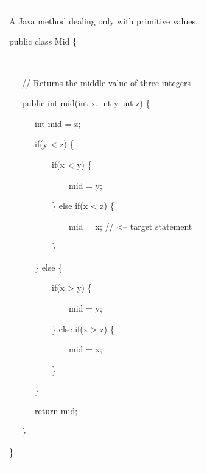 \documentclass{article}
\newenvironment{tmindent}{\begin{tmparmod}{1.5em}{0pt}{0pt} }{\end{tmparmod}}
\newenvironment{tmparmod}[3]{\begin{list}{}{\setlength{\topsep}{0pt}\setlength{\leftmargin}{#1}\setlength{\rightmargin}{#2}\setlength{\parindent}{#3}\setlength{\listparindent}{\parindent}\setlength{\itemindent}{\parindent}\setlength{\parsep}{\parskip}} \item[]}{\end{list}}
\newenvironment{tmparsep}[1]{\begingroup\setlength{\parskip}{#1}}{\endgroup}
\begin{document}
\begin{tmparmod}{1cm}{0pt}{0pt}
  \begin{tmparmod}{0pt}{1cm}{0pt}
    {\noindent}{\noindent}\begin{tabular}{l}
      \begin{example}
        A Java method dealing only with primitive values.
        
        {\noindent}\begin{tmindent}
          \begin{tmparsep}{0em}
            public class Mid \{
            
            \ \ \
            
            \ \ \ // Returns the middle value of three integers
            
            \ \ \ public int mid(int x, int y, int z) \{
            
            \ \ \ \ \ \ int mid = z;
            
            \ \ \ \ \ \ if(y < z) \{
            
            \ \ \ \ \ \ \ \ \ \ if(x < y) \{
            
            \ \ \ \ \ \ \ \ \ \ \ \ \ \ mid = y;
            
            \ \ \ \ \ \ \ \ \ \ \} else if(x < z) \{
            
            \ \ \ \ \ \ \ \ \ \ \ \ \ \ mid = x; // <-- target statement
            
            \ \ \ \ \ \ \ \ \ \ \}
            
            \ \ \ \ \ \ \} else \{
            
            \ \ \ \ \ \ \ \ \ \ if(x > y) \{
            
            \ \ \ \ \ \ \ \ \ \ \ \ \ \ mid = y;
            
            \ \ \ \ \ \ \ \ \ \ \} else if(x > z) \{
            
            \ \ \ \ \ \ \ \ \ \ \ \ \ \ mid = x;
            
            \ \ \ \ \ \ \ \ \ \ \}
            
            \ \ \ \ \ \ \}
            
            \ \ \ \ \ \ return mid; \ \ \ \ \ \ \ \ \ \ \ \ \
            
            \ \ \ \}
            
            \}
          \end{tmparsep}
        \end{tmindent}{\hspace*{\fill}}{\medskip}
      \end{example}
    \end{tabular}{\hspace*{\fill}}{\smallskip}
  \end{tmparmod}
\end{tmparmod}
\end{document}

